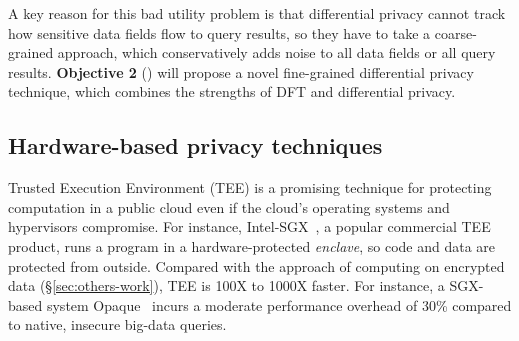A key reason for this bad utility problem is that differential privacy cannot 
track how sensitive data fields flow to query results, so they have to take a 
coarse-grained approach, which conservatively adds noise to all data fields 
or all query results. \textbf{Objective 2} () will propose a 
novel fine-grained differential privacy technique, which combines the strengths 
of DFT and differential privacy.



% 
% 



\vspace{-.15in}\subsection{Hardware-based privacy techniques}
\label{sec:sgx}\vspace{-.075in}

Trusted Execution Environment (TEE) is a promising technique for
protecting computation in a public cloud even if the cloud's operating systems 
and hypervisors compromise. For instance, Intel-SGX~\cite{intel-sgx}, a 
popular commercial TEE product, runs a program in a hardware-protected 
\emph{enclave}, so code and data are protected from outside. Compared with the 
approach of computing on encrypted data (\S\ref{sec:others-work}), TEE is 100X 
to 1000X faster. For instance, a SGX-based system Opaque~\cite{opaque:nsdi17} 
incurs a moderate performance overhead of 30\% compared to native, insecure 
big-data queries.


